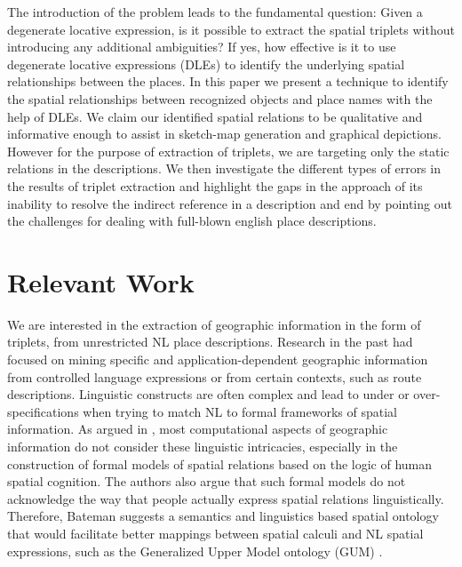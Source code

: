 \documentclass{acm_proc_article-sp}
\begin{document}
The introduction of the problem leads to the fundamental question: Given a degenerate locative expression, is it possible to extract the spatial triplets without introducing any additional ambiguities? If yes, how effective is it to use degenerate locative expressions (DLEs) to identify the underlying spatial relationships between the places. In this paper we present a technique to identify the spatial relationships between recognized objects and place names with the help of DLEs. We claim our identified spatial relations to be qualitative and informative enough to assist in sketch-map generation and graphical depictions. However for the purpose of extraction of triplets, we are targeting only the static relations in the descriptions. We then investigate the different types of errors in the results of triplet extraction and highlight the gaps in the approach of its inability to resolve the indirect reference in a description and end by pointing out the challenges for dealing with full-blown english place descriptions.
\section{Relevant Work}
We are interested in the extraction of geographic information in the form of triplets, from unrestricted NL place descriptions. Research in the past had focused on mining specific and application-dependent geographic information from controlled language expressions \cite{kelleher:perceptually, Hanjing:route, tappan:knowledge} or from certain contexts, such as route descriptions. Linguistic constructs are often complex and lead to under or over-specifications when trying to match NL to formal frameworks of spatial information. As argued in \cite{Bateman:ontology}, most computational aspects of geographic information do not consider these linguistic intricacies, especially in the construction of formal models of spatial relations based on the logic of human spatial cognition. The authors also argue that such formal models do not acknowledge the way that people actually express spatial relations linguistically. Therefore, Bateman \cite{Bateman:language} suggests a semantics and linguistics based spatial ontology that would facilitate better mappings between spatial calculi and NL spatial expressions, such as the Generalized Upper Model ontology (GUM) \cite{Bateman:data}. 
\end{document}
